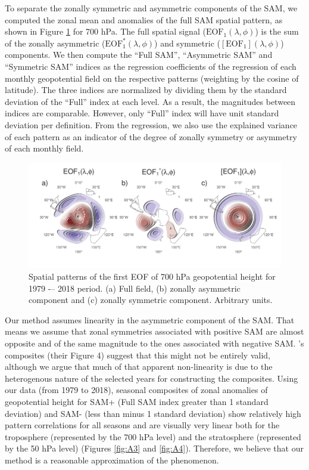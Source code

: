 \documentclass[smallextended]{svjour3}       %
\begin{document}
To separate the zonally symmetric and asymmetric components of the SAM, we computed the zonal mean and anomalies of the full SAM spatial pattern, as shown in Figure \ref{fig:method} for 700 hPa. The full spatial signal (\(\mathrm{EOF_1}(\lambda, \phi)\)) is the sum of the zonally asymmetric (\(\mathrm{EOF_1^*}(\lambda, \phi)\)) and symmetric (\([\mathrm{EOF_1}](\lambda, \phi)\)) components. We then compute the ``Full SAM'', ``Asymmetric SAM'' and ``Symmetric SAM'' indices as the regression coefficients of the regression of each monthly geopotential field on the respective patterns (weighting by the cosine of latitude). The three indices are normalized by dividing them by the standard deviation of the ``Full'' index at each level. As a result, the magnitudes between indices are comparable. However, only ``Full'' index will have unit standard deviation per definition. From the regression, we also use the explained variance of each pattern as an indicator of the degree of zonally symmetry or asymmetry of each monthly field.

\begin{figure}
\includegraphics{method-1} \caption{Spatial patterns of the first EOF of 700 hPa geopotential height for 1979 -– 2018 period. (a) Full field, (b) zonally asymmetric component and (c) zonally symmetric component. Arbitrary units.}\label{fig:method}
\end{figure}

Our method assumes linearity in the asymmetric component of the SAM. That means we assume that zonal symmetries associated with positive SAM are almost opposite and of the same magnitude to the ones associated with negative SAM. \citet{fogt2012}'s composites (their Figure 4) suggest that this might not be entirely valid, although we argue that much of that apparent non-linearity is due to the heterogenous nature of the selected years for constructing the composites. Using our data (from 1979 to 2018), seasonal composites of zonal anomalies of geopotential height for SAM+ (Full SAM index greater than 1 standard deviation) and SAM- (less than minus 1 standard deviation) show relatively high pattern correlations for all seasons and are visually very linear both for the troposphere (represented by the 700 hPa level) and the stratosphere (represented by the 50 hPa level) (Figures \ref{fig:A3} and \ref{fig:A4}). Therefore, we believe that our method is a reasonable approximation of the phenomenon.
\end{document}
